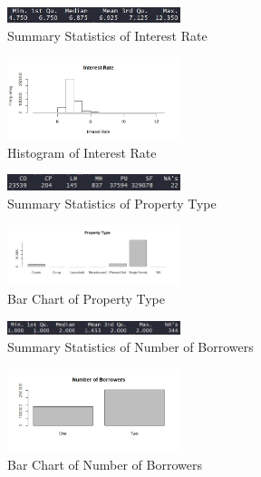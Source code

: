 \documentclass[10pt,twocolumn,letterpaper]{article}
\begin{document}
\begin{figure}
	\includegraphics[width=0.45\textwidth]{images/IRS.JPG}
	\caption{Summary Statistics of Interest Rate}
	\label{fig:IRS}
\end{figure}
\begin{figure}
	\includegraphics[width=0.45\textwidth]{images/IRB.jpeg}
	\caption{Histogram of Interest Rate}
	\label{fig:IRB}
\end{figure}

\begin{figure}
	\includegraphics[width=0.45\textwidth]{images/PTS.JPG}
	\caption{Summary Statistics of Property Type}
	\label{fig:PTS}
\end{figure}
\begin{figure}
	\includegraphics[width=0.45\textwidth]{images/PTB.jpeg}
	\caption{Bar Chart of Property Type}
	\label{fig:PTB}
\end{figure}

\begin{figure}
	\includegraphics[width=0.45\textwidth]{images/NOBS.JPG}
	\caption{Summary Statistics of Number of Borrowers}
	\label{fig:NOBS}
\end{figure}
\begin{figure}
	\includegraphics[width=0.45\textwidth]{images/NOBB.jpeg}
	\caption{Bar Chart of Number of Borrowers}
	\label{fig:NOBB}
\end{figure}
\end{document}
